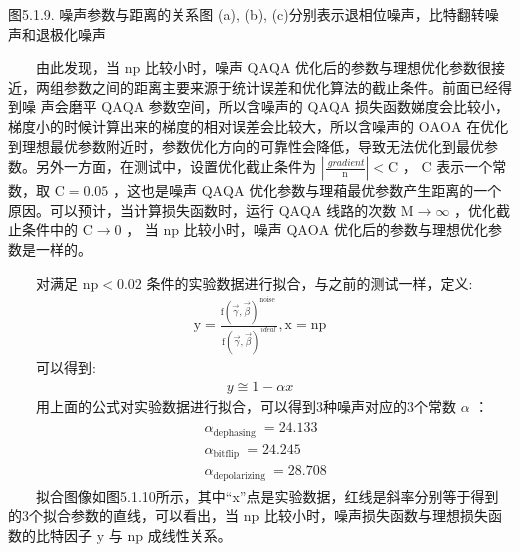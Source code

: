 \documentclass[a4paper,11pt,english]{sphinxmanual}
\let\sphinxpxdimen\pdfpxdimen\else\newdimen\sphinxpxdimen
\begin{document}
\noindent{\hspace*{\fill}\sphinxincludegraphics[width=900\sphinxpxdimen]{{5.1.9}.png}\hspace*{\fill}}

\begin{center}图5.1.9. 噪声参数与距离的关系图 (a), (b), (c)分别表示退相位噪声，比特翻转噪声和退极化噪声
\end{center}
\sphinxAtStartPar
  由此发现，当 \(\mathrm{np}\) 比较小时，噪声 \(\mathrm{QAQA}\) 优化后的参数与理想优化参数很接近，两组参数之间的距离主要来源于统计误差和优化算法的截止条件。前面已经得到噪 声会磨平 \(\mathrm{QAQA}\) 参数空间，所以含噪声的 \(\mathrm{QAQA}\) 损失函数娣度会比较小，梯度小的时候计算出来的梯度的相对误差会比较大，所以含噪声的 \(\mathrm{OAOA}\) 在优化到理想最优参数附近时，参数优化方向的可靠性会降低，导致无法优化到最优参数。另外一方面，在测试中，设置优化截止条件为  \(\left|\frac{\ g r a d i e n t}{\mathrm{n}}\right|<\mathrm{C}\) ， \(\mathrm{C}\) 表示一个常数，取  \(\mathrm{C}=0.05\) ，这也是噪声  \(\mathrm{QAQA}\) 优化参数与理葙最优参数产生距离的一个原因。可以预计，当计算损失函数时，运行  \(\mathrm{QAQA}\) 线路的次数  \(\mathrm{M} \rightarrow \infty\) ，优化截止条件中的  \(\mathrm{C} \rightarrow 0\) ， 当  \(\mathrm{np}\) 比较小时，噪声  \(\mathrm{QAOA}\) 优化后的参数与理想优化参数是一样的。

\sphinxAtStartPar
  对满足 \(\mathrm{np}<0.02\) 条件的实验数据进行拟合，与之前的测试一样，定义:
\begin{equation*}
\begin{split}\mathrm{y}=\frac{\mathrm{f}(\vec{\gamma}, \vec{\beta})^{\text {noise }}}{\mathrm{f}(\vec{\gamma}, \vec{\beta})^{i d e a l}}, \mathrm{x}=\mathrm{np}\end{split}
\end{equation*}
\sphinxAtStartPar
  可以得到:
\begin{equation*}
\begin{split}y \cong 1-\alpha x\end{split}
\end{equation*}
\sphinxAtStartPar
  用上面的公式对实验数据进行拟合，可以得到3种噪声对应的3个常数 \(\alpha\) ：
\begin{equation*}
\begin{split}\begin{aligned} &\alpha_{\text {dephasing }}=24.133 \\ &\alpha_{\text {bitflip }}=24.245 \\ &\alpha_{\text {depolarizing }}=28.708 \end{aligned}\end{split}
\end{equation*}
\sphinxAtStartPar
  拟合图像如图5.1.10所示，其中“x”点是实验数据，红线是斜率分别等于得到的3个拟合参数的直线，可以看出，当 \(\mathrm{np}\) 比较小时，噪声损失函数与理想损失函数的比特因子 \(\mathrm{y}\) 与 \(\mathrm{np}\) 成线性关系。
\end{document}
